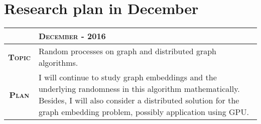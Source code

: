 \documentclass[12pt,twoside]{article}
\begin{document}
\section{Research plan in December}

\begin{center}
  \renewcommand{\arraystretch}{1.5}
  \begin{longtable}{| c | p{12cm} |}
  \hline
  & \textbf{\textsc{December - 2016}} \\ \hline
  \textbf{\textsc{Topic}} & Random processes on graph and distributed graph algorithms.\\ \hline
  \textbf{\textsc{Plan}} & I will continue to study graph embeddings and the underlying
  randomness in this algorithm mathematically. Besides, I will also consider a distributed
  solution for the graph embedding problem, possibly application using GPU.
  \\ \hline
  \end{longtable}
\end{center}
\end{document}
